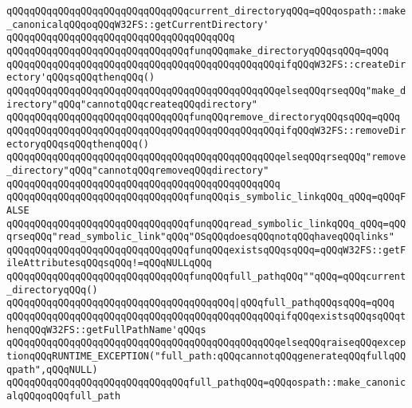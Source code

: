 \newline
\verb|qQQqqQQqqQQqqQQqqQQqqQQqqQQqqQQqcurrent_directoryqQQq=qQQqospath::make_canonicalqQQqoqQQqW32FS::getCurrentDirectory'|\newline
\verb|qQQqqQQqqQQqqQQqqQQqqQQqqQQqqQQqqQQqqQQq|\newline
\verb|qQQqqQQqqQQqqQQqqQQqqQQqqQQqqQQqfunqQQqmake_directoryqQQqsqQQq=qQQq|\newline
\verb|qQQqqQQqqQQqqQQqqQQqqQQqqQQqqQQqqQQqqQQqqQQqqQQqifqQQqW32FS::createDirectory'qQQqsqQQqthenqQQq()|\newline
\verb|qQQqqQQqqQQqqQQqqQQqqQQqqQQqqQQqqQQqqQQqqQQqqQQqelseqQQqrseqQQq"make_directory"qQQq"cannotqQQqcreateqQQqdirectory"|\newline
\newline
\verb|qQQqqQQqqQQqqQQqqQQqqQQqqQQqqQQqfunqQQqremove_directoryqQQqsqQQq=qQQq|\newline
\verb|qQQqqQQqqQQqqQQqqQQqqQQqqQQqqQQqqQQqqQQqqQQqqQQqifqQQqW32FS::removeDirectoryqQQqsqQQqthenqQQq()|\newline
\verb|qQQqqQQqqQQqqQQqqQQqqQQqqQQqqQQqqQQqqQQqqQQqqQQqelseqQQqrseqQQq"remove_directory"qQQq"cannotqQQqremoveqQQqdirectory"|\newline
\verb|qQQqqQQqqQQqqQQqqQQqqQQqqQQqqQQqqQQqqQQqqQQqqQQq|\newline
\verb|qQQqqQQqqQQqqQQqqQQqqQQqqQQqqQQqfunqQQqis_symbolic_linkqQQq_qQQq=qQQqFALSE|\newline
\verb|qQQqqQQqqQQqqQQqqQQqqQQqqQQqqQQqfunqQQqread_symbolic_linkqQQq_qQQq=qQQqrseqQQq"read_symbolic_link"qQQq"OSqQQqdoesqQQqnotqQQqhaveqQQqlinks"|\newline
\newline
\verb|qQQqqQQqqQQqqQQqqQQqqQQqqQQqqQQqfunqQQqexistsqQQqsqQQq=qQQqW32FS::getFileAttributesqQQqsqQQq!=qQQqNULLqQQq|\newline
\newline
\verb|qQQqqQQqqQQqqQQqqQQqqQQqqQQqqQQqfunqQQqfull_pathqQQq""qQQq=qQQqcurrent_directoryqQQq()|\newline
\verb|qQQqqQQqqQQqqQQqqQQqqQQqqQQqqQQqqQQqqQQq|\verb#|qQQqfull_pathqQQqsqQQq=qQQq#\newline
\verb|qQQqqQQqqQQqqQQqqQQqqQQqqQQqqQQqqQQqqQQqqQQqqQQqifqQQqexistsqQQqsqQQqthenqQQqW32FS::getFullPathName'qQQqs|\newline
\verb|qQQqqQQqqQQqqQQqqQQqqQQqqQQqqQQqqQQqqQQqqQQqqQQqelseqQQqraiseqQQqexceptionqQQqRUNTIME_EXCEPTION("full_path:qQQqcannotqQQqgenerateqQQqfullqQQqpath",qQQqNULL)|\newline
\verb|qQQqqQQqqQQqqQQqqQQqqQQqqQQqqQQqfull_pathqQQq=qQQqospath::make_canonicalqQQqoqQQqfull_path|\newline
